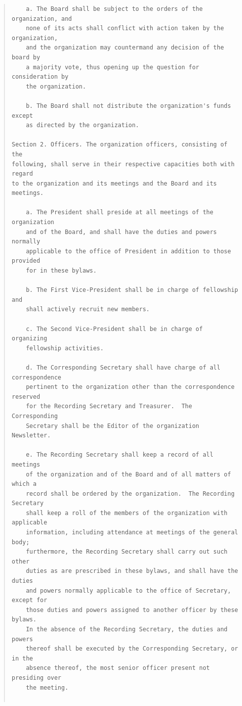 \documentclass{article}
\begin{document}
\begin{quote}
\begin{verbatim}
    a. The Board shall be subject to the orders of the organization, and
    none of its acts shall conflict with action taken by the organization,
    and the organization may countermand any decision of the board by
    a majority vote, thus opening up the question for consideration by
    the organization.

    b. The Board shall not distribute the organization's funds except
    as directed by the organization.

Section 2. Officers. The organization officers, consisting of the
following, shall serve in their respective capacities both with regard
to the organization and its meetings and the Board and its meetings.

    a. The President shall preside at all meetings of the organization
    and of the Board, and shall have the duties and powers normally
    applicable to the office of President in addition to those provided
    for in these bylaws.

    b. The First Vice-President shall be in charge of fellowship and
    shall actively recruit new members.

    c. The Second Vice-President shall be in charge of organizing
    fellowship activities.

    d. The Corresponding Secretary shall have charge of all correspondence
    pertinent to the organization other than the correspondence reserved
    for the Recording Secretary and Treasurer.  The Corresponding
    Secretary shall be the Editor of the organization Newsletter.

    e. The Recording Secretary shall keep a record of all meetings
    of the organization and of the Board and of all matters of which a
    record shall be ordered by the organization.  The Recording Secretary
    shall keep a roll of the members of the organization with applicable
    information, including attendance at meetings of the general body;
    furthermore, the Recording Secretary shall carry out such other
    duties as are prescribed in these bylaws, and shall have the duties
    and powers normally applicable to the office of Secretary, except for
    those duties and powers assigned to another officer by these bylaws.
    In the absence of the Recording Secretary, the duties and powers
    thereof shall be executed by the Corresponding Secretary, or in the
    absence thereof, the most senior officer present not presiding over
    the meeting.


\end{verbatim}
\end{quote}
\end{document}
